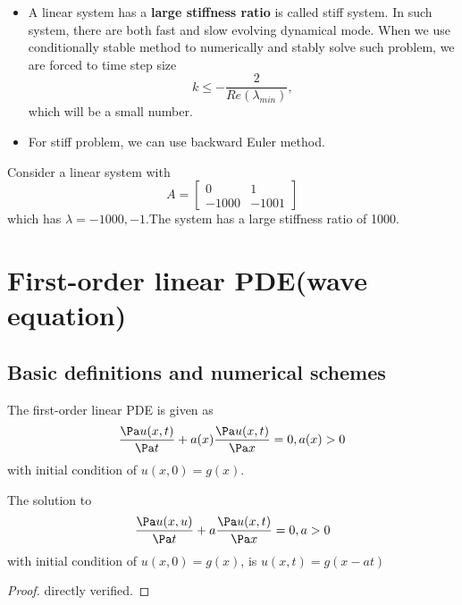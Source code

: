 \begin{refsection}
\begin{remark}\hfill
	\begin{itemize}
		\item A linear system has a \textbf{large stiffness ratio} is called stiff system. In such system, there are both fast and slow evolving dynamical mode. When we use conditionally stable method to numerically and stably solve such problem, we are forced to time step size $$k \leq -\frac{2}{Re(\lambda_{min})},$$ which will be a small number. 
		\item For stiff problem, we can use backward Euler method.
	\end{itemize}
\end{remark}

\begin{example}
Consider a linear system with 
$$A = \begin{bmatrix}
0 & 1\\
-1000 & -1001
\end{bmatrix}$$
which has $\lambda=-1000,-1$.The system has a large stiffness ratio of 1000.
\end{example}








\section{First-order linear PDE(wave equation)}
\subsection{Basic definitions and numerical schemes}
\begin{definition}
The first-order linear PDE is given as
$$\frac{\Pa u(x,t)}{\Pa t} + a(x)\frac{\Pa u(x,t)}{\Pa x} = 0, a(x) > 0$$
with initial condition of $u(x,0) = g(x)$.
\end{definition}

\begin{remark}
\end{remark}

\begin{lemma}\cite[132]{holmes2007introduction}
The solution to $$\frac{\Pa u(x,u)}{\Pa t} + a\frac{\Pa u(x,t)}{\Pa x} = 0,a>0$$
with initial condition of $u(x,0) = g(x)$, is $u(x,t) = g(x-at)$
\end{lemma}
\begin{proof}
directly verified.	
\end{proof}


\end{refsection}

